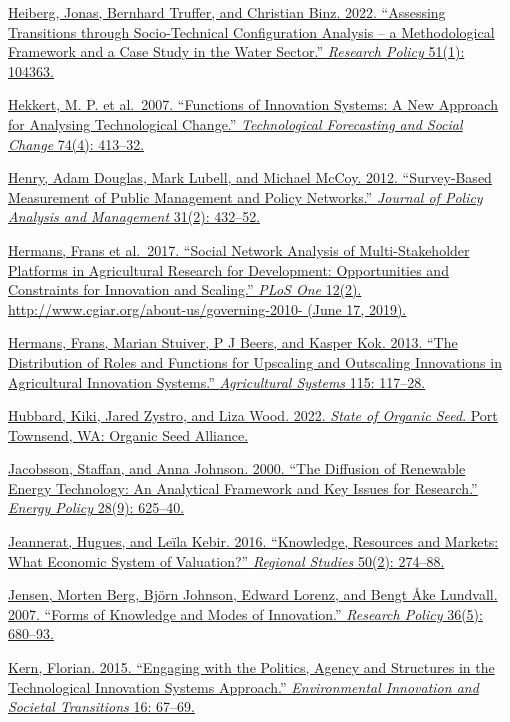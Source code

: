 \documentclass[twoside,12pt,final]{ucthesis-CA2012}
\begin{document}
\begin{ucmainmatter}
\href{https://www.zotero.org/google-docs/?hv36Bh}{Heiberg, Jonas, Bernhard Truffer, and Christian Binz. 2022. ``Assessing
Transitions through Socio-Technical Configuration Analysis -- a
Methodological Framework and a Case Study in the Water Sector.''
\emph{Research Policy} 51(1):
104363.}

\href{https://www.zotero.org/google-docs/?hv36Bh}{Hekkert, M. P. et al.~2007. ``Functions of Innovation Systems: A New
Approach for Analysing Technological Change.'' \emph{Technological Forecasting
and Social Change} 74(4):
413--32.}

\href{https://www.zotero.org/google-docs/?hv36Bh}{Henry, Adam Douglas, Mark Lubell, and Michael McCoy. 2012.
``Survey‐Based Measurement of Public Management and Policy Networks.''
\emph{Journal of Policy Analysis and Management} 31(2):
432--52.}

\href{https://www.zotero.org/google-docs/?hv36Bh}{Hermans, Frans et al.~2017. ``Social Network Analysis of
Multi-Stakeholder Platforms in Agricultural Research for Development:
Opportunities and Constraints for Innovation and Scaling.'' \emph{PLoS One}
12(2). http://www.cgiar.org/about-us/governing-2010- (June 17,
2019).}

\href{https://www.zotero.org/google-docs/?hv36Bh}{Hermans, Frans, Marian Stuiver, P J Beers, and Kasper Kok. 2013. ``The
Distribution of Roles and Functions for Upscaling and Outscaling
Innovations in Agricultural Innovation Systems.'' \emph{Agricultural Systems}
115: 117--28.}

\href{https://www.zotero.org/google-docs/?hv36Bh}{Hubbard, Kiki, Jared Zystro, and Liza Wood. 2022. \emph{State of Organic
Seed}. Port Townsend, WA: Organic Seed
Alliance.}

\href{https://www.zotero.org/google-docs/?hv36Bh}{Jacobsson, Staffan, and Anna Johnson. 2000. ``The Diffusion of Renewable
Energy Technology: An Analytical Framework and Key Issues for Research.''
\emph{Energy Policy} 28(9):
625--40.}

\href{https://www.zotero.org/google-docs/?hv36Bh}{Jeannerat, Hugues, and Leïla Kebir. 2016. ``Knowledge, Resources and
Markets: What Economic System of Valuation?'' \emph{Regional Studies} 50(2):
274--88.}

\href{https://www.zotero.org/google-docs/?hv36Bh}{Jensen, Morten Berg, Björn Johnson, Edward Lorenz, and Bengt Åke
Lundvall. 2007. ``Forms of Knowledge and Modes of Innovation.'' \emph{Research
Policy} 36(5): 680--93.}

\href{https://www.zotero.org/google-docs/?hv36Bh}{Kern, Florian. 2015. ``Engaging with the Politics, Agency and Structures
in the Technological Innovation Systems Approach.'' \emph{Environmental
Innovation and Societal Transitions} 16:
67--69.}


\end{ucmainmatter}
\end{document}

